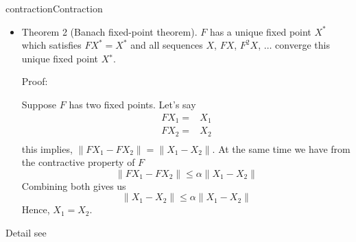 \documentclass[9pt]{article}
\begin{document}
\begin{topic}{contraction}{Contraction}
\begin{itemize}
\item Theorem 2 (Banach fixed-point theorem). $F$ has a unique fixed point $X^*$ which satisfies $FX^* = X^*$ and all
sequences $X$, $FX$, $F^2X$, $\ldots$ converge this unique fixed point $X^∗$.

Proof:

Suppose $F$ has two fixed points. Let's say
\begin{displaymath}
  \begin{split}
  FX_1 = & X_1\\
  FX_2 = & X_2\\
  \end{split}
\end{displaymath}
this implies, $\| FX_1 - FX_2\| = \| X_1-X_2 \|$. At the same time we have from the contractive property of $F$ 
\begin{displaymath}
  \|FX_1-FX_2\| \le \alpha \|X_1-X_2\|
\end{displaymath}
Combining both gives us 
\[
\|X_1-X_2\| \le \alpha\|X_1-X_2\|
\]
Hence, $X_1=X_2$.
\end{itemize}

Detail see \citep{conrad2014contraction}
\end{topic}
\end{document}
